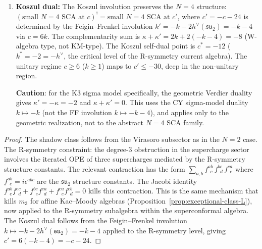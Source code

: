 \begin{proposition}[Small $N{=}4$ SCA shadow data;
 \ClaimStatusProvedHere]
\begin{enumerate}[label=\textup{(\roman*)},nosep]
\item \textbf{Koszul dual:}
 The Koszul involution preserves the $N{=}4$ structure:
 $(\text{small $N{=}4$ SCA at $c$})^!
 = \text{small $N{=}4$ SCA at $c'$}$,
 where $c' = -c - 24$ is determined by the
 Feigin--Frenkel involution
 $k' = -k - 2h^\vee(\mathfrak{su}_2) = -k - 4$ via
 $c = 6k$. The complementarity sum is
 $\kappa + \kappa' = 2k + 2(-k-4) = -8$
 \textup{(}W-algebra type, not KM-type\textup{)}.
 The Koszul self-dual point is $c^* = -12$
 \textup{(}$k^* = -2 = -h^\vee$, the critical level of
 the R-symmetry current algebra\textup{)}. The unitary
 regime $c \ge 6$ \textup{(}$k \ge 1$\textup{)} maps to
 $c' \le -30$, deep in the non-unitary region.

 \textbf{Caution}: for the K3 sigma model specifically,
 the geometric Verdier duality gives $\kappa' = -\kappa = -2$
 and $\kappa + \kappa' = 0$. This uses the CY sigma-model
 duality $k \mapsto -k$ \textup{(}not the FF involution
 $k \mapsto -k - 4$\textup{)}, and applies only to the
 geometric realization, not to the abstract $N{=}4$ SCA family.
\end{enumerate}
\end{proposition}

\begin{proof}
The shadow class follows from the Virasoro subsector as in the
$N{=}2$ case. The R-symmetry constraint: the degree-$3$
obstruction in the supercharge sector involves the iterated OPE
of three supercharges mediated by the R-symmetry structure
constants. The relevant contraction has the form
$\sum_{a,b} f^{ab}_{\ \ c}\, f^{bc}_{\ \ d}\, f^{ca}_{\ \ e}$
where $f^{ab}_{\ \ c} = i\epsilon^{abc}$ are the
$\mathfrak{su}_2$ structure constants. The Jacobi identity
$f^{ab}_{\ \ e} f^{ec}_{\ \ d} + f^{bc}_{\ \ e} f^{ea}_{\ \ d}
+ f^{ca}_{\ \ e} f^{eb}_{\ \ d} = 0$ kills this contraction.
This is the same mechanism that kills $m_3$ for affine
Kac--Moody algebras
(Proposition~\ref{prop:exceptional-class-L}), now applied to the
R-symmetry subalgebra within the superconformal algebra. The
Koszul dual follows from the Feigin--Frenkel involution
$k \mapsto -k - 2h^\vee(\mathfrak{su}_2) = -k - 4$ applied
to the R-symmetry level, giving $c' = 6(-k-4) = -c - 24$.
\end{proof}

